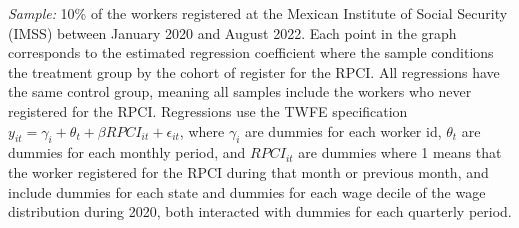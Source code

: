 \documentclass[oneside,11pt]{article}
\begin{document}
\scriptsize{
\noindent \textit{Sample:} 10\% of the workers registered at the Mexican Institute of Social Security (IMSS) between January 2020 and August 2022. Each point in the graph corresponds to the estimated regression coefficient where the sample conditions the treatment group by the cohort of register for the RPCI. All regressions have the same control group, meaning all samples include the workers who never registered for the RPCI. Regressions use the TWFE specification $y_{it} = \gamma_{i} + \theta_{t}+ \beta RPCI_{it} +\epsilon_{it}$, where $\gamma_{i}$ are dummies for each worker id, $\theta_{t}$ are dummies for each monthly period, and $RPCI_{it}$ are dummies where 1 means that the worker registered for the RPCI during that month or previous month, and include dummies for each state and dummies for each wage decile of the wage distribution during 2020, both interacted with dummies for each quarterly period. 
}

\clearpage
\end{document}
